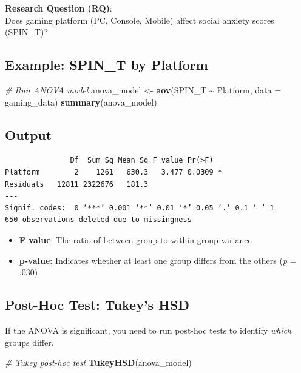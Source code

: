 \documentclass[
]{book}
\newenvironment{Shaded}{\begin{snugshade}}{\end{snugshade}}
\newcommand{\AttributeTok}[1]{\textcolor[rgb]{0.13,0.29,0.53}{#1}}
\newcommand{\CommentTok}[1]{\textcolor[rgb]{0.56,0.35,0.01}{\textit{#1}}}
\newcommand{\FunctionTok}[1]{\textcolor[rgb]{0.13,0.29,0.53}{\textbf{#1}}}
\newcommand{\NormalTok}[1]{#1}
\newcommand{\OtherTok}[1]{\textcolor[rgb]{0.56,0.35,0.01}{#1}}
\newcommand{\SpecialCharTok}[1]{\textcolor[rgb]{0.81,0.36,0.00}{\textbf{#1}}}
\providecommand{\tightlist}{%
  \setlength{\itemsep}{0pt}\setlength{\parskip}{0pt}}
\begin{document}
\textbf{Research Question (RQ)}:\\
Does gaming platform (PC, Console, Mobile) affect social anxiety scores (SPIN\_T)?

\subsection{Example: SPIN\_T by Platform}\label{example-spin_t-by-platform}

\begin{Shaded}
\begin{Highlighting}[]
\CommentTok{\# Run ANOVA model}
\NormalTok{anova\_model }\OtherTok{\textless{}{-}} \FunctionTok{aov}\NormalTok{(SPIN\_T }\SpecialCharTok{\textasciitilde{}}\NormalTok{ Platform, }\AttributeTok{data =}\NormalTok{ gaming\_data)}
\FunctionTok{summary}\NormalTok{(anova\_model)}
\end{Highlighting}
\end{Shaded}

\subsection{Output}\label{output-3}

\begin{verbatim}
               Df  Sum Sq Mean Sq F value Pr(>F)  
Platform        2    1261   630.3   3.477 0.0309 *
Residuals   12811 2322676   181.3                 
---
Signif. codes:  0 ‘***’ 0.001 ‘**’ 0.01 ‘*’ 0.05 ‘.’ 0.1 ‘ ’ 1
650 observations deleted due to missingness            
\end{verbatim}

\begin{itemize}
\tightlist
\item
  \textbf{F value}: The ratio of between-group to within-group variance
\item
  \textbf{p-value}: Indicates whether at least one group differs from the others (\emph{p} = .030)
\end{itemize}

\subsection{Post-Hoc Test: Tukey's HSD}\label{post-hoc-test-tukeys-hsd}

If the ANOVA is significant, you need to run post-hoc tests to identify \emph{which} groups differ.

\begin{Shaded}
\begin{Highlighting}[]
\CommentTok{\# Tukey post{-}hoc test}
\FunctionTok{TukeyHSD}\NormalTok{(anova\_model)}
\end{Highlighting}
\end{Shaded}
\end{document}
